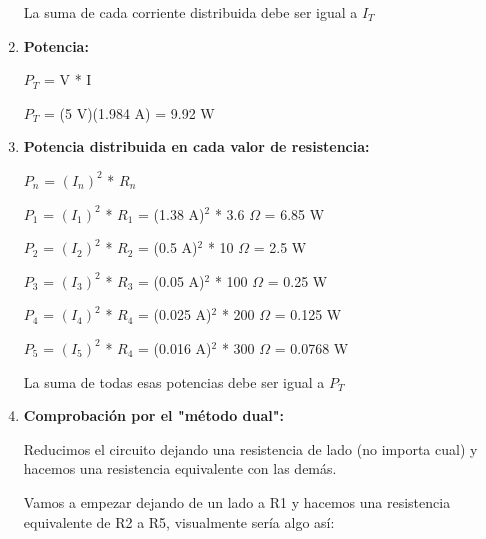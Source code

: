 \documentclass[a4paper,11pt]{article}
\begin{document}
\begin{enumerate}
    \noindent La suma de cada corriente distribuida debe ser igual a $I_T$
    \item \textbf{Potencia:}
    
    $P_T$ = V * I 

    $P_T$  = (5 V)(1.984 A) = 9.92 W
    \item \textbf{Potencia distribuida en cada valor de resistencia:}
    
    $P_n$ = $(I_n)^{2}$ * $R_n$

    $P_1$ = $(I_1)^{2}$ * $R_1$ = (1.38 A)$^{2}$ * 3.6 $\Omega$ = 6.85 W

    $P_2$ = $(I_2)^{2}$ * $R_2$ = (0.5 A)$^{2}$ * 10 $\Omega$ = 2.5 W

    $P_3$ = $(I_3)^{2}$ * $R_3$ = (0.05 A)$^{2}$ * 100 $\Omega$ = 0.25 W

    $P_4$ = $(I_4)^{2}$ * $R_4$ = (0.025 A)$^{2}$ * 200 $\Omega$ = 0.125 W

    $P_5$ = $(I_5)^{2}$ * $R_4$ = (0.016 A)$^{2}$ * 300 $\Omega$ = 0.0768 W

    \noindent La suma de todas esas potencias debe ser igual a $P_T$
    \newpage
    \item \textbf{Comprobación por el "método dual":}
    
    \noindent Reducimos el circuito dejando una resistencia de lado (no importa cual) y hacemos una resistencia equivalente con las demás.

    Vamos a empezar dejando de un lado a R1 y hacemos una resistencia equivalente de R2 a R5, visualmente sería algo así:


\end{enumerate}
\end{document}
